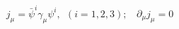 \begin{equation}
j_{\mu} = \bar{\psi}^{i} \gamma_{\mu} \psi^{i} , ~~(i = 1, 2, 3);~~~~
\partial_{\mu} j_{\mu} = 0 
\end{equation}

